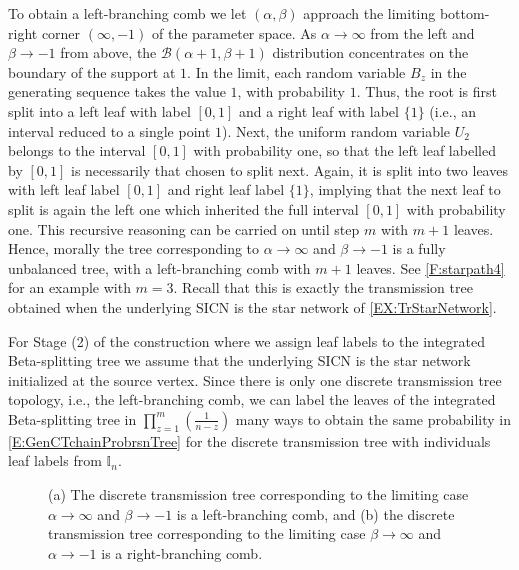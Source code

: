 \documentclass[review]{elsarticle}
\numberwithin{equation}{section}
\let\orgautoref\autoref
\renewcommand{\autoref}
        {\def\equationautorefname{Eq.}%
         \def\figureautorefname{Fig.}%
         \def\subfigureautorefname{Fig.}%
         \def\sectionautorefname{Sect.}%
         \def\subsectionautorefname{Sect.}%
         \def\subsubsectionautorefname{Sect.}%
         \def\Itemautorefname{item}%
         \def\tableautorefname{Table}%
         \def\propositionautorefname{Prop.}%
         \def\corollaryautorefname{Corollary}%
         \def\theoremautorefname{Theorem}%
         \def\remarkautorefname{Remark}%
         \def\lemmaautorefname{Lemma}%
         \def\proofofautorefname{Proof}%
         \def\exampleautorefname{Example}%
         \orgautoref}
\newcommand{\bI}{{\mathbb I}}
\def\calB{\mathcal{B}}
\begin{document}
To obtain a left-branching comb we let $(\alpha,\beta)$ approach the limiting bottom-right corner $(\infty,-1)$ of the parameter space.  
As $\alpha \to \infty$ from the left and $\beta\rightarrow -1$ from above, the $\calB(\alpha+1,\beta+1)$ distribution concentrates on the boundary of the support at $1$.  
In the limit, each random variable $B_z$ in the generating sequence takes the value $1$, with probability $1$.  
Thus, the root is first split into a left leaf with label $[0,1]$ and a right leaf with label $\{1\}$ (i.e., an interval reduced to a single point $1$).  
Next, the uniform random variable $U_2$ belongs to the interval $[0,1]$ with probability one, so that the left leaf labelled by $[0,1]$ is necessarily that chosen to split next.  
Again, it is split into two leaves with left leaf label $[0,1]$ and right leaf label $\{1\}$, implying that the next leaf to split is again the left one which inherited the full interval $[0,1]$ with probability one.  
This recursive reasoning can be carried on until step $m$ with $m+1$ leaves.  
Hence, morally the tree corresponding to $\alpha \to \infty$ and $\beta \to -1$ is a fully unbalanced tree, with a left-branching comb with $m+1$ leaves.  
See \autoref{F:starpath4} for an example with $m=3$.
Recall that this is exactly the transmission tree obtained when the underlying SICN is the star network of \autoref{EX:TrStarNetwork}.

For Stage (2) of the construction where we assign leaf labels to the integrated Beta-splitting tree we assume that the underlying SICN is the star network initialized at the source vertex.  
Since there is only one discrete transmission tree topology, i.e., the left-branching comb, 
we can label the leaves of the integrated Beta-splitting tree in $\prod_{z=1}^{m} \left( \frac{1}{n-z}\right)$ many ways to obtain the same probability in \autoref{E:GenCTchainProbrsnTree} for the discrete transmission tree with individuals leaf labels from $\bI_n$. 

\begin{figure}[t]
\begin {center}
\scalebox{.85}{

}
\end{center}
\caption{\label{F:starpath4}(a) The discrete transmission tree corresponding to the limiting case $\alpha \to \infty$ and $\beta \to -1$ is a left-branching comb, and (b) the discrete transmission tree corresponding to the limiting case $\beta \to \infty$ and $\alpha \to -1$ is a right-branching comb.}
\end{figure}
\end{document}
